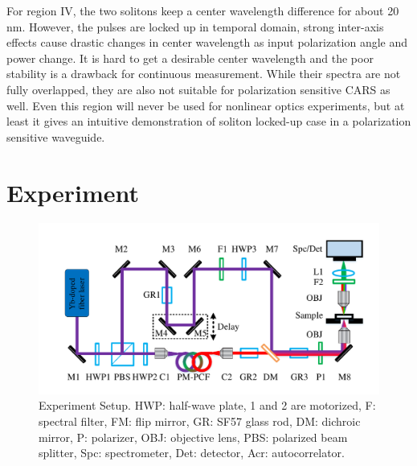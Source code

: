 \documentclass{osa-article}
\begin{document}
For region IV, the two solitons keep a center wavelength difference for about 20 nm. However, the pulses are locked up in temporal domain, strong inter-axis effects cause drastic changes in center wavelength as input polarization angle and power change. It is hard to get a desirable center wavelength and the poor stability is a drawback for continuous measurement. While their spectra are not fully overlapped, they are also not suitable for polarization sensitive CARS as well\cite{Hofer2017}. Even this region will never be used for nonlinear optics experiments, but at least it gives an intuitive demonstration of soliton locked-up case in a polarization sensitive waveguide.   

\section{Experiment}


\begin{figure}[htbp]
    \centering%
    \includegraphics[width=350pt]{fig_sys.pdf}
    \caption{Experiment Setup. HWP: half-wave plate, 1 and 2 are motorized, F: spectral filter, FM: flip mirror, GR: SF57 glass rod, DM: dichroic mirror, P: polarizer, OBJ: objective lens, PBS: polarized beam splitter, Spc: spectrometer, Det: detector, Acr: autocorrelator.}
    \label{fig_EC}\vspace*{-6pt}
\end{figure}
\end{document}
